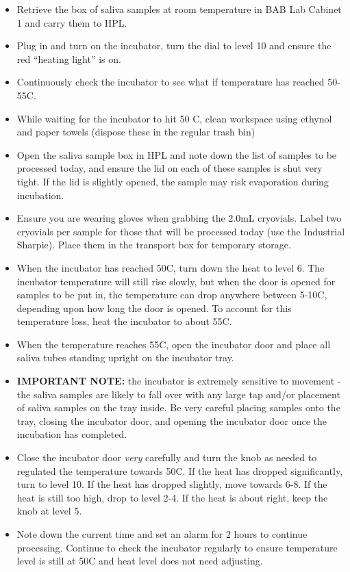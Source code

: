 \documentclass[
]{book}
\providecommand{\tightlist}{%
  \setlength{\itemsep}{0pt}\setlength{\parskip}{0pt}}
\begin{document}
\begin{itemize}
\tightlist
\item
  Retrieve the box of saliva samples at room temperature in BAB Lab Cabinet 1 and carry them to HPL.
\item
  Plug in and turn on the incubator, turn the dial to level 10 and ensure the red ``heating light'' is on.
\item
  Continuously check the incubator to see what if temperature has reached 50-55C.
\item
  While waiting for the incubator to hit 50 C, clean workspace using ethynol and paper towels (dispose these in the regular trash bin)
\item
  Open the saliva sample box in HPL and note down the list of samples to be processed today, and ensure the lid on each of these samples is shut very tight. If the lid is slightly opened, the sample may risk evaporation during incubation.
\item
  Ensure you are wearing gloves when grabbing the 2.0mL cryovials. Label two cryovials per sample for those that will be processed today (use the Industrial Sharpie). Place them in the transport box for temporary storage.
\item
  When the incubator has reached 50C, turn down the heat to level 6. The incubator temperature will still rise slowly, but when the door is opened for samples to be put in, the temperature can drop anywhere between 5-10C, depending upon how long the door is opened. To account for this temperature loss, heat the incubator to about 55C.
\item
  When the temperature reaches 55C, open the incubator door and place all saliva tubes standing upright on the incubator tray.
\item
  \textbf{IMPORTANT NOTE:} the incubator is extremely sensitive to movement - the saliva samples are likely to fall over with any large tap and/or placement of saliva samples on the tray inside. Be very careful placing samples onto the tray, closing the incubator door, and opening the incubator door once the incubation has completed.
\item
  Close the incubator door \emph{very} carefully and turn the knob as needed to regulated the temperature towards 50C. If the heat has dropped significantly, turn to level 10. If the heat has dropped slightly, move towards 6-8. If the heat is still too high, drop to level 2-4. If the heat is about right, keep the knob at level 5.
\item
  Note down the current time and set an alarm for 2 hours to continue processing. Continue to check the incubator regularly to ensure temperature level is still at 50C and heat level does not need adjusting.
\end{itemize}
\end{document}
